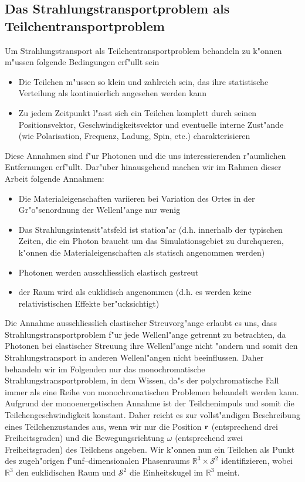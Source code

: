 \documentclass[11pt,a4paper,DIVcalc,BCOR8mm,titlepage,twoside]{scrartcl}
\begin{document}
	\subsection{Das Strahlungstransportproblem als Teilchentransportproblem}
	Um Strahlungstransport als Teilchentransportproblem behandeln zu k"onnen m"ussen folgende Bedingungen erf"ullt sein
	\begin{itemize}
		\item{Die Teilchen m"ussen so klein und zahlreich sein, das ihre statistische Verteilung als kontinuierlich angesehen werden kann}
		\item{Zu jedem Zeitpunkt l"asst sich ein Teilchen komplett durch seinen Positionsvektor, Geschwindigkeitsvektor und eventuelle interne Zust"ande (wie Polarisation, Frequenz, Ladung, Spin, etc.) charakterisieren}
	\end{itemize}
	Diese Annahmen sind f"ur Photonen und die uns interessierenden r"aumlichen Entfernungen erf"ullt.
	Dar"uber hinausgehend machen wir im Rahmen dieser Arbeit folgende Annahmen:
	\begin{itemize}
		\item{Die Materialeigenschaften variieren bei Variation des Ortes in der Gr"o"senordnung der Wellenl"ange nur wenig}
		\item{Das Strahlungsintensit"atsfeld ist station"ar (d.h. innerhalb der typischen Zeiten, die ein Photon braucht um das Simulationsgebiet zu durchqueren, k"onnen die Materialeigenschaften als statisch angenommen werden)}
		\item{Photonen werden ausschliesslich elastisch gestreut}
		\item{der Raum wird als euklidisch angenommen (d.h. es werden keine relativistischen Effekte ber"ucksichtigt)}
	\end{itemize}
	Die Annahme ausschliesslich elastischer Streuvorg"ange erlaubt es uns, dass Strahlungstransportproblem f"ur jede Wellenl"ange getrennt zu betrachten, da Photonen bei elastischer Streuung ihre Wellenl"ange nicht "andern und somit den Strahlungstransport in anderen Wellenl"angen nicht beeinflussen. Daher behandeln wir im Folgenden nur das monochromatische Strahlungstransportproblem, in dem Wissen, da"s der polychromatische Fall immer als eine Reihe von monochromatischen Problemen behandelt werden kann. Aufgrund der monoenergetischen Annahme ist der Teilchenimpuls und somit die Teilchengeschwindigkeit konstant. Daher reicht es zur vollst"andigen Beschreibung eines Teilchenzustandes aus, wenn wir nur die Position $\mathbf{r}$ (entsprechend drei Freiheitsgraden) und die Bewegungsrichtung $\omega$ (entsprechend zwei Freiheitsgraden) des Teilchens angeben. Wir k"onnen nun ein Teilchen als Punkt des zugeh"origen f"unf--dimensionalen Phasenraums $\mathbb{R}^3 \times \mathcal{S}^2$ identifizieren, wobei $\mathbb{R}^3$ den euklidischen Raum und $\mathcal{S}^2$ die Einheitskugel im $\mathbb{R}^3$ meint.
	
\end{document}
